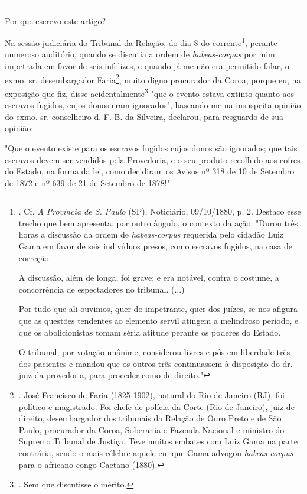 \_\_\_\_\_

Por que escrevo este artigo?

Na sessão judiciária do Tribunal da Relação, do dia 8 do
corrente\footnote{. Cf. \emph{A Província de S. Paulo} (SP), Noticiário,
  09/10/1880, p. 2. Destaco esse trecho que bem apresenta, por outro
  ângulo, o contexto da ação: "Durou três horas a discussão da ordem de
  \emph{habeas-corpus} requerida pelo cidadão Luiz Gama em favor de seis
  indivíduos presos, como escravos fugidos, na casa de correção.

  A discussão, além de longa, foi grave; e era notável, contra o
  costume, a concorrência de espectadores no tribunal. (...)

  Por tudo que ali ouvimos, quer do impetrante, quer dos juízes, se nos
  afigura que as questões tendentes ao elemento servil atingem a
  melindroso período, e que os abolicionistas tomam séria atitude
  perante os poderes do Estado.

  O tribunal, por votação unânime, considerou livres e pôs em liberdade
  três dos pacientes e mandou que os outros três continuassem à
  disposição do dr. juiz da provedoria, para proceder como de direito."},
perante numeroso auditório, quando se discutia a ordem de
\emph{habeas-corpus} por mim impetrada em favor de seis infelizes, e
quando já me não era permitido falar, o exmo. sr. desembargador
Faria\footnote{. José Francisco de Faria (1825-1902), natural do Rio de
  Janeiro (RJ), foi político e magistrado. Foi chefe de polícia da Corte
  (Rio de Janeiro), juiz de direito, desembargador dos tribunais da
  Relação de Ouro Preto e de São Paulo, procurador da Coroa, Soberania e
  Fazenda Nacional e ministro do Supremo Tribunal de Justiça. Teve
  muitos embates com Luiz Gama na parte contrária, sendo o mais célebre
  aquele em que Gama advogou \emph{habeas-corpus} para o africano congo
  Caetano (1880).}, muito digno procurador da Coroa, porque eu, na
exposição que fiz, disse acidentalmente\footnote{. Sem que discutisse o
  mérito.} "que o evento estava extinto quanto aos escravos fugidos,
cujos donos eram ignorados", baseando-me na insuspeita opinião do exmo.
sr. conselheiro d. F. B. da Silveira, declarou, para resguardo de sua
opinião:

"Que o evento existe para os escravos fugidos cujos donos são ignorados;
que tais escravos devem ser vendidos pela Provedoria, e o seu produto
recolhido aos cofres do Estado, na forma da lei, como decidiram os
Avisos nº 318 de 10 de Setembro de 1872 e nº 639 de 21 de Setembro de
1878!"

